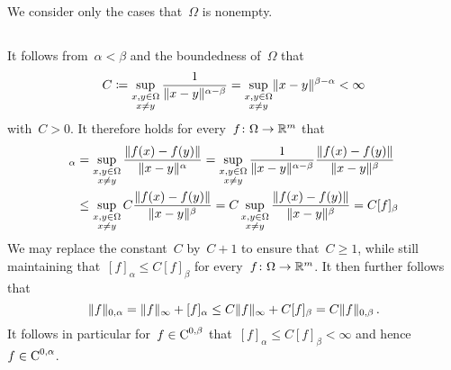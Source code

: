 \section{}

We consider only the cases that~$\Omega$ is nonempty.




\subsection{}

It follows from~$\alpha < \beta$ and the boundedness of~$\Omega$ that
\[
            C
  \coloneqq  \sup_{\substack{x, y \in \Omega \\ x \neq y}}
            \frac{1}{\lVert x - y\rVert^{\alpha - \beta}}
  =         \sup_{\substack{x, y \in \Omega \\ x \neq y}}
            \lVert x - y\rVert^{\beta - \alpha}
  <         \infty
\]
with~$C > 0$.
It therefore holds for every~$f \colon \Omega \to \mathbb{R}^m$ that
\begin{align*}
        [f]_{\alpha}
  &=    \sup_{\substack{x, y \in \Omega \\ x \neq y}}
        \frac{\norm{f(x) - f(y)}}{\norm{x - y}^\alpha}
   =    \sup_{\substack{x, y \in \Omega \\ x \neq y}}
        \frac{1}{\norm{x - y}^{\alpha - \beta}}
        \frac{\norm{f(x) - f(y)}}{\norm{x - y}^\beta} \\
  &\leq \sup_{\substack{x, y \in \Omega \\ x \neq y}}
        C
        \frac{\norm{f(x) - f(y)}}{\norm{x - y}^\beta}
   =    C
        \sup_{\substack{x, y \in \Omega \\ x \neq y}}
        \frac{\norm{f(x) - f(y)}}{\norm{x - y}^\beta}
   =    C [f]_{\beta}
\end{align*}
We may replace the constant~$C$ by~$C+1$ to ensure that~$C \geq 1$, while still maintaining that~$[f]_\alpha \leq C [f]_\beta$ for every~$f \colon \Omega \to \mathbb{R}^m$.
It then further follows that
\[
        \lVert f\rVert_{0,\alpha}
  =     \lVert f\rVert_\infty + [f]_\alpha
  \leq  C \lVert f\rVert_\infty + C [f]_\beta
  =     C \lVert f\rVert_{0,\beta} \,.
\]
It follows in particular for~$f \in \operatorname{C}^{0,\beta}$ that~$[f]_\alpha \leq C [f]_\beta < \infty$ and hence~$f \in \operatorname{C}^{0,\alpha}$.





\subsection{}

